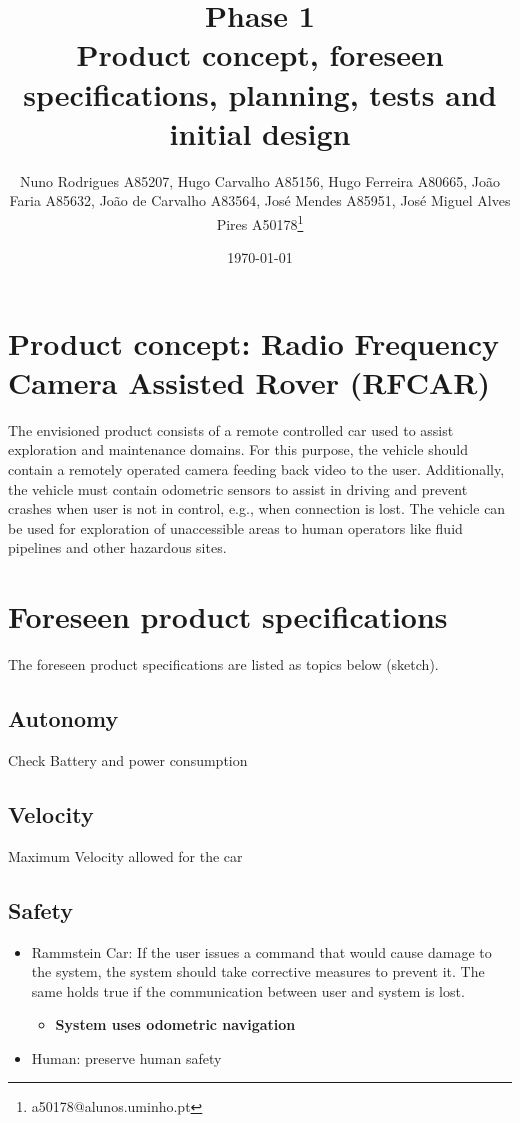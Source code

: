 \documentclass[11pt]{article}
\author{Nuno Rodrigues A85207, Hugo Carvalho A85156, Hugo Ferreira A80665, João Faria A85632, João de Carvalho A83564, José Mendes A85951, José Miguel Alves Pires A50178\thanks{a50178@alunos.uminho.pt}}
\date{\today}
\title{Phase 1\\\medskip
\large Product concept, foreseen specifications, planning, tests and initial design}
\begin{document}
\maketitle
\tableofcontents


\section{Product concept: Radio Frequency Camera Assisted Rover (RFCAR)}
\label{sec:orgf4f2e51}
The envisioned product consists of a remote controlled car used to assist
exploration and maintenance domains. For this purpose, the vehicle should contain a
remotely operated camera feeding back video to the user. Additionally, the
vehicle must contain odometric sensors to assist in driving and prevent
crashes when user is not in control, e.g., when connection is lost.
The vehicle can be used for exploration of unaccessible areas to human operators
like fluid pipelines and other hazardous sites.

\section{Foreseen product specifications}
\label{sec:org942ed5c}
The foreseen product specifications are listed as topics below (sketch).

\subsection{Autonomy}
\label{sec:org7364ba5}
Check Battery and power consumption
\subsection{Velocity}
\label{sec:orgb41b31b}
Maximum Velocity allowed for the car
\subsection{Safety}
\label{sec:org4323985}
\begin{itemize}
\item Rammstein Car: If the user issues a command that would cause damage to the system, the
system should take corrective measures to prevent it. The same holds true if
the communication between user and system is lost.
\begin{itemize}
\item \textbf{System uses odometric navigation}
\end{itemize}
\item Human: preserve human safety
\end{itemize}
\end{document}
